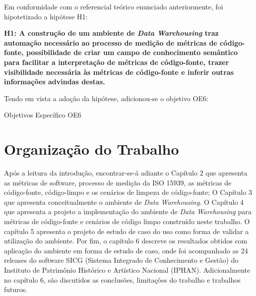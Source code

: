 Em conformidade com o referencial teórico enunciado anteriormente, foi hipotetizado a hipótese H1:

\textbf{H1: A construção de um ambiente de \textit{Data Warehousing} traz automação necessário ao processo de medição de métricas de código-fonte, possibilidade de criar um campo de conhecimento semântico para facilitar a interpretação de métricas de código-fonte, trazer visibilidade necessária às métricas de código-fonte e inferir outras informações advindas destas.} 

Tendo em vista a adoção da hipótese, adicionou-se o objetivo OE6:
\begin{table}[H]
\centering

\caption{Objetivos Específico OE6}
\label{tbl:obj} 
\end{table}
\FloatBarrier


\section{Organização do Trabalho}

Após a leitura da introdução, encontrar-se-á adiante o Capítulo 2 que apresenta as 
métricas de software, processo de medição da ISO 15939, 
as métricas de código-fonte, código-limpo e os cenários de limpeza de código-fonte; O Capítulo 3 que apresenta conceitualmente o ambiente de \textit{Data Warehousing}. O Capítulo 4 que apresenta a projeto  a implementação do ambiente de \textit{Data Warehousing} para métricas de código-fonte e cenários de código limpo construído neste trabalho. O capítulo 5 apresenta o projeto de estudo de caso do uso como forma de validar a utilização do ambiente. Por fim, o capítulo 6 descreve os resultados obtidos com aplicação do ambiente em forma de estudo de caso, onde foi acompanhado as 24 releases do software SICG (Sistema Integrado de Conhecimento e Gestão) do Instituto de Patrimônio Histórico e Artístico Nacional (IPHAN). Adicionalmente no capítulo 6, são discutidos as conclusões, limitações do trabalho e trabalhos futuros.   